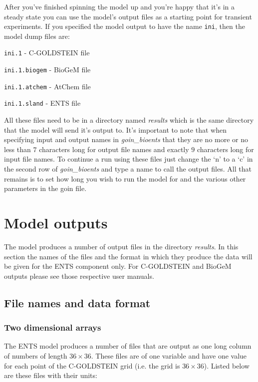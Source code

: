 \documentclass[10pt,a4paper]{report}
\begin{document}
After you've finished spinning the model up and you're happy that
it's in a steady state you can use the model's output files as a
starting point for transient experiments. If you specified the model
output to have the name {\tt ini}, then the model dump files are:

{\tt ini.1} - C-GOLDSTEIN file

{\tt ini.1.biogem} - BioGeM file

{\tt ini.1.atchem} - AtChem file

{\tt ini.1.sland} - ENTS file

All these files need to be in a directory named {\em results} which
is the same directory that the model will send it's output to. It's
important to note that when specifying input and output names in
{\em goin\_bioents} that they are no more or no less than $7$
characters long for output file names and exactly $9$ characters
long for input file names. To continue a run using these files just
change the `n' to a `c' in the second row of {\em goin\_bioents} and
type a name to call the output files. All that remains is to set how
long you wish to run the model for and the various other parameters
in the goin file.

\chapter{Model outputs}

The model produces a number of output files in the directory {\em
results}. In this section the names of the files and the format in
which they produce the data will be given for the ENTS component
only. For C-GOLDSTEIN and BioGeM outputs please see those respective
user manuals.

\section{File names and data format}

\subsection{Two dimensional arrays}

The ENTS model produces a number of files that are output as one
long column of numbers of length $36 \times 36$. These files are of
one variable and have one value for each point of the C-GOLDSTEIN
grid (i.e. the grid is $36 \times 36$). Listed below are these files
with their units:
\end{document}
